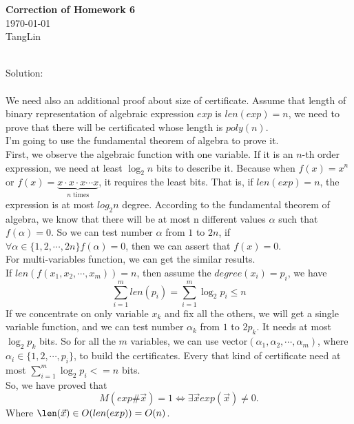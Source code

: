 \documentclass[a4papper]{article}
\theoremstyle{neosn}
\begin{document}
    \begin{center}
    {\bf Correction of Homework 6} \\
        \today \\
        TangLin
    \end{center}

    \correction{}
    \\
    Solution:\\
    \\
    We need also an additional proof about size of certificate.
    Assume that length of binary representation of algebraic expression $exp$ is $len(exp) = n$,
    we need to prove that there will be certificated whose length is $poly(n)$. \\
    I'm going to use the fundamental theorem of algebra to prove it. \\
    First, we observe the algebraic function with one variable.
    If it is an $n$-th order expression, we need at least $\log_2 n$ bits to describe it.
    Because when $f(x) = x^n$ or $f(x) = \underbrace{x\cdot x \cdot x \cdots x}_{n \text{ times}}$,
    it requires the least bits.
    That is, if $len(exp) = n$, the expression is at most $log_2 n$ degree.
    According to the fundamental theorem of algebra, we know that there will be at most n different
    values $\alpha$ such that $f(\alpha) = 0$.
    So we can test number $\alpha$ from $1$ to $2n$, if $\forall \alpha \in \{1,2,\cdots, 2n\} f(\alpha) = 0$,
    then we can assert that $f(x) = 0$. \\
    For multi-variables function, we can get the similar results. \\
    If $len(f(x_1, x_2, \cdots , x_m)) = n$, then assume the $degree(x_i) = p_i$, we have
    \[
        \sum_{i=1}^m len(p_i) = \sum_{i=1}^m \log_2 p_i \leqslant n
    \]
    If we concentrate on only variable $x_k$ and fix all the others, we will get a single variable
    function, and we can test number $\alpha_k$ from $1$ to $2p_k$.
    It needs at most $\log_2 p_k$ bits.
    So for all the $m$ variables, we can use vector$(\alpha_1, \alpha_2, \cdots, \alpha_m)$,
    where$\alpha_i \in \{1, 2, \cdots, p_i\}$, to build the certificates.
    Every that kind of certificate need at most $\sum_{i=1}^{m} \log_2 p_i <= n$ bits.\\
    So, we have proved that
    \[
        M(exp\#\vec{x}) = 1 \Leftrightarrow \exists \vec{x} exp(\vec{x}) \neq 0.
    \]
    Where $\len(\vec{x}) \in O(len(exp)) = O(n)$.
\end{document}
